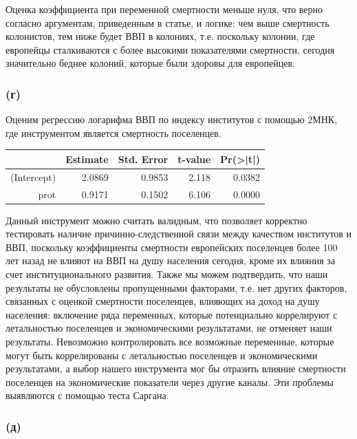 \documentclass[a4paper,12pt]{article} %
\begin{document}
Оценка коэффициента при переменной смертности меньше нуля, что верно согласно аргументам, приведенным в статье,  и логике: чем выше смертность колонистов, тем ниже будет ВВП в колониях, т.е. поскольку колонии, где европейцы сталкиваются с более высокими показателями смертности, сегодня значительно беднее колоний, которые были здоровы для европейцев. 

\newpage

\subsubsection*{(г)}	

Оценим регрессию логарифма ВВП по индексу институтов с помощью 2МНК, где инструментом является смертность  поселенцев.

\begin{table}[h!]
	\centering
	\begin{tabular}{rrrrr}
		\hline
		& Estimate & Std. Error & t-value & Pr(>|t|) \\ 
		\hline
		(Intercept) &  2.0869 &    0.9853 &  2.118 &  0.0382 \\ 
		prot & 0.9171  &   0.1502 &  6.106 & 0.0000 
		\\ 
		\hline
	\end{tabular}
\end{table}	

 Данный
инструмент можно  считать валидным, что 
позволяет корректно тестировать наличие причинно-следственной
связи между качеством институтов и ВВП, поскольку коэффициенты смертности европейских поселенцев более 100 лет назад не влияют на ВВП на душу населения сегодня, кроме их влияния за счет институционального развития. 
Также мы можем подтвердить, что наши результаты не обусловлены пропущенными факторами, т.е. нет других факторов, связанных с оценкой смертности поселенцев, влияющих на доход на душу населения: 
включение ряда переменных, которые потенциально коррелируют с летальностью поселенцев и экономическими результатами, не  отменяет наши результаты.
Невозможно контролировать все возможные переменные, которые могут быть коррелированы с летальностью поселенцев и экономическими результатами, а выбор нашего инструмента мог бы отразить влияние смертности поселенцев на экономические показатели через  другие каналы. Эти проблемы выявляются   с помощью  теста  Саргана.
 

\subsubsection*{(д)}	
\end{document}
